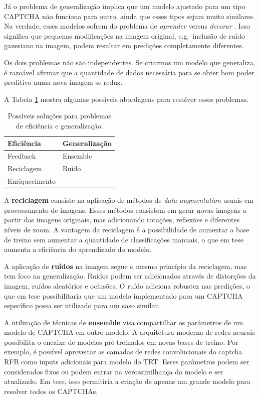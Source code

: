 \documentclass[12pt,]{report}
\begin{document}
Já o problema de generalização implica que um modelo ajustado para um
tipo CAPTCHA não funciona para outro, ainda que esses tipos sejam muito
similares. Na verdade, esses modelos sofrem do problema de
\emph{aprender} versus \emph{decorar} \citep{zhang2016understanding}.
Isso significa que pequenas modificações na imagem original,
e.g.~inclusão de ruído gaussiano na imagem, podem resultar em predições
completamente diferentes.

Os dois problemas não são independentes. Se criarmos um modelo que
generaliza, é razoável afirmar que a quantidade de dados necessária para
se obter bom poder preditivo numa nova imagem se reduz.

A Tabela \ref{tab:solucoes} mostra algumas possíveis abordagens para
resolver esses problemas.

\begin{table}

\caption{\label{tab:solucoes}Possíveis soluções para problemas de eficiência e generalização.}
\centering
\begin{tabular}[t]{l|l}
\hline
Eficiência & Generalização\\
\hline
Feedback & Ensemble\\
\hline
Reciclagem & Ruído\\
\hline
Enriquecimento & \\
\hline
\end{tabular}
\end{table}

A \textbf{reciclagem} consiste na aplicação de métodos de \emph{data
augmentation} usuais em processamento de imagens. Esses métodos
consistem em gerar novas imagens a partir das imagens originais, mas
adicionando rotações, reflexões e diferentes níveis de zoom. A vantagem
da reciclagem é a possibilidade de aumentar a base de treino sem
aumentar a quantidade de classificações manuais, o que em tese aumenta a
eficiência do aprendizado do modelo.

A aplicação de \textbf{ruídos} na imagem segue o mesmo princípio da
reciclagem, mas tem foco na generalização. Ruídos podem ser adicionados
através de distorções da imagem, ruídos aleatórios e oclusões. O ruído
adiciona robustez nas predições, o que em tese possibilitaria que um
modelo implementado para um CAPTCHA específico possa ser utilizado para
um caso similar.

A utilização de técnicas de \textbf{ensemble} visa compartilhar os
parâmetros de um modelo de CAPTCHA em outro modelo. A arquitetura
moderna de redes neurais possibilita o encaixe de modelos pré-treinados
em novas bases de treino. Por exemplo, é possível aproveitar as camadas
de redes convolucionais do captcha RFB como inputs adicionais para
modelo do TRT. Esses parâmetros podem ser considerados fixos ou podem
entrar na verossimilhança do modelo e ser atualizado. Em tese, isso
permitiria a criação de apenas um grande modelo para resolver todos os
CAPTCHAs.
\end{document}
